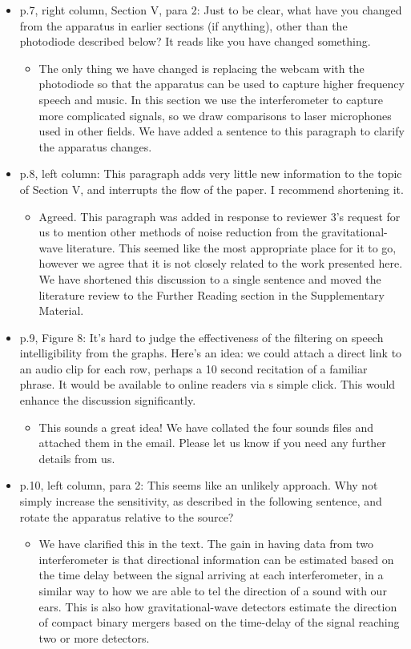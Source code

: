 \documentclass[a4paper, 10pt]{letter}
\begin{document}
\begin{itemize}
\item p.7, right column, Section V, para 2: Just to be clear, what have you changed from the apparatus in earlier sections (if anything), other than the photodiode described below? It reads like you have changed something.
\begin{itemize}
\item The only thing we have changed is replacing the webcam with the photodiode so that the apparatus can be used to capture higher frequency speech and music. In this section we use the interferometer to capture more complicated signals, so we draw comparisons to laser microphones used in other fields. We have added a sentence to this paragraph to clarify the apparatus changes. 
\end{itemize}

\item p.8, left column: This paragraph adds very little new information to the topic of Section V, and interrupts the flow of the paper. I recommend shortening it. 
\begin{itemize}
\item Agreed. This paragraph was added in response to reviewer 3's request for us to mention other methods of noise reduction from the gravitational-wave literature. This seemed like the most appropriate place for it to go, however we agree that it is not closely related to the work presented here. We have shortened this discussion to a single sentence and moved the literature review to the Further Reading section in the Supplementary Material. 
\end{itemize}

\item p.9, Figure 8: It's hard to judge the effectiveness of the filtering on speech intelligibility from the graphs. Here's an idea: we could attach a direct link to an audio clip for each row, perhaps a 10 second recitation of a familiar phrase. It would be available to online readers via s simple click. This would enhance the discussion significantly.
\begin{itemize}
\item This sounds a great idea! We have collated the four sounds files and attached them in the email. Please let us know if you need any further details from us. 
\end{itemize}

\item p.10, left column, para 2: This seems like an unlikely approach. Why not simply increase the sensitivity, as described in the following sentence, and rotate the apparatus relative to the source?
\begin{itemize}
\item We have clarified this in the text. The gain in having data from two interferometer is that directional information can be estimated based on the time delay between the signal arriving at each interferometer, in a similar way to how we are able to tel the direction of a sound with our ears. This is also how gravitational-wave detectors estimate the direction of compact binary mergers based on the time-delay of the signal reaching two or more detectors. 
\end{itemize}


\end{itemize}
\end{document}
